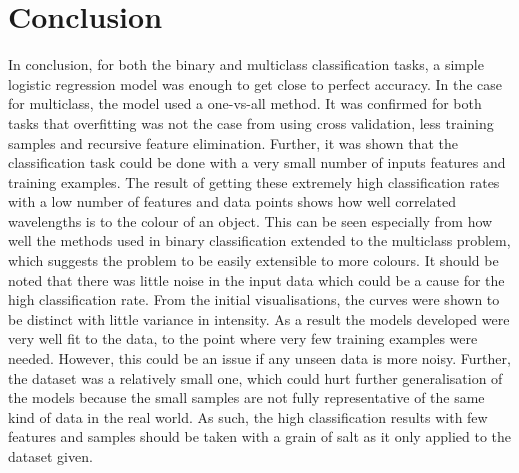 \documentclass{article}
\begin{document}
\section{Conclusion}
In conclusion, for both the binary and multiclass classification tasks, a simple logistic regression model was enough to get close to perfect accuracy. In the case for multiclass, the model used a one-vs-all method. It was confirmed for both tasks that overfitting was not the case from using cross validation, less training samples and recursive feature elimination. Further, it was shown that the classification task could be done with a very small number of inputs features and training examples.
\n
The result of getting these extremely high classification rates with a low number of features and data points shows how well correlated wavelengths is to the colour of an object. This can be seen especially from how well the methods used in binary classification extended to the multiclass problem, which suggests the problem to be easily extensible to more colours. It should be noted that there was little noise in the input data which could be a cause for the high classification rate. From the initial visualisations, the curves were shown to be distinct with little variance in intensity. As a result the models developed were very well fit to the data, to the point where very few training examples were needed. However, this could be an issue if any unseen data is more noisy. Further, the dataset was a relatively small one, which could hurt further generalisation of the models because the small samples are not fully representative of the same kind of data in the real world. As such, the high classification results with few features and samples should be taken with a grain of salt as it only applied to the dataset given. 
\end{document}
